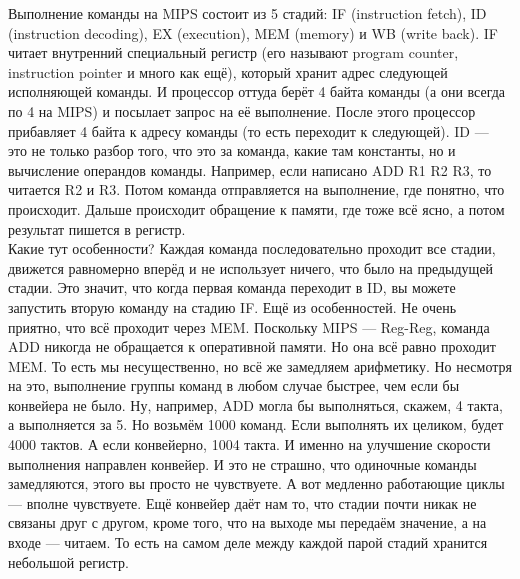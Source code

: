 \documentclass{article}
\begin{document}
    Выполнение команды на MIPS состоит из 5 стадий: IF (instruction fetch), ID (instruction decoding), EX (execution), MEM (memory) и WB (write back).
    IF читает внутренний специальный регистр (его называют program counter, instruction pointer и много как ещё), который хранит адрес следующей исполняющей команды. И процессор оттуда берёт 4 байта команды (а они всегда по 4 на MIPS) и посылает запрос на её выполнение. После этого процессор прибавляет 4 байта к адресу команды (то есть переходит к следующей). ID --- это не только разбор того, что это за команда, какие там константы, но и вычисление операндов команды. Например, если написано ADD R1 R2 R3, то читается R2 и R3. Потом команда отправляется на выполнение, где понятно, что происходит. Дальше происходит обращение к памяти, где тоже всё ясно, а потом результат пишется в регистр.\\
    Какие тут особенности? Каждая команда последовательно проходит все стадии, движется равномерно вперёд и не использует ничего, что было на предыдущей стадии. Это значит, что когда первая команда переходит в ID, вы можете запустить вторую команду на стадию IF. Ещё из особенностей. Не очень приятно, что всё проходит через MEM. Поскольку MIPS --- Reg-Reg, команда ADD никогда не обращается к оперативной памяти. Но она всё равно проходит MEM. То есть мы несущественно, но всё же замедляем арифметику. Но несмотря на это, выполнение группы команд в любом случае быстрее, чем если бы конвейера не было. Ну, например, ADD могла бы выполняться, скажем, 4 такта, а выполняется за 5. Но возьмём 1000 команд. Если выполнять их целиком, будет 4000 тактов. А если конвейерно, 1004 такта. И именно на улучшение скорости выполнения направлен конвейер. И это не страшно, что одиночные команды замедляются, этого вы просто не чувствуете. А вот медленно работающие циклы --- вполне чувствуете. Ещё конвейер даёт нам то, что стадии почти никак не связаны друг с другом, кроме того, что на выходе мы передаём значение, а на входе --- читаем. То есть на самом деле между каждой парой стадий хранится небольшой регистр.
\end{document}
